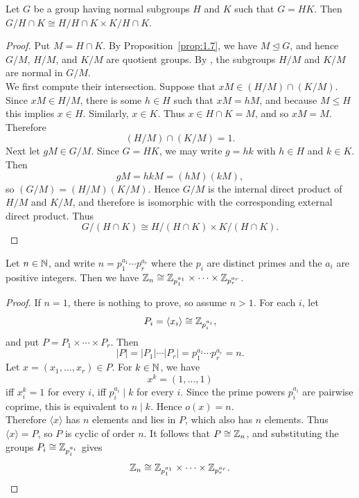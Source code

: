 \documentclass[../Odyssey_Project.tex]{subfiles}
\begin{document}
\begin{lemma}
\label{lem:2.7}
Let $G$ be a group having normal subgroups $H$ and $K$ such that $G = HK$. Then $G/H \cap K \cong H/H \cap K \times K/H \cap K$.
\end{lemma}
\begin{proof}
    Put $M = H \cap K$. By Proposition~\ref{prop:1.7}, we have $M \trianglelefteq G$, and hence $G/M$, $H/M$, and $K/M$ are quotient groups. By , the subgroups $H/M$ and $K/M$ are normal in $G/M$. \\
    We first compute their intersection. Suppose that $xM \in (H/M) \cap (K/M)$. Since $xM \in H/M$, there is some $h \in H$ such that $xM = hM$, and because $M \leq H$ this implies $x \in H$. Similarly, $x \in K$. Thus $x \in H \cap K = M$, and so $xM = M$. Therefore
    \[
        (H/M) \cap (K/M) = 1.
    \]
    Next let $gM \in G/M$. Since $G = HK$, we may write $g = hk$ with $h \in H$ and $k \in K$. Then
    \[
        gM = hkM = (hM)(kM),
    \]
    so $(G/M) = (H/M)(K/M)$. Hence $G/M$ is the internal direct product of $H/M$ and $K/M$, and therefore is isomorphic with the corresponding external direct product. Thus
    \[
        G/(H \cap K) \cong H/(H \cap K) \times K/(H \cap K).
    \]
\end{proof}

\begin{lemma}
\label{lem:2.8}
Let $n \in \mathbb{N}$, and write $n = p_1^{a_1} \cdots p_r^{a_r}$ where the $p_i$ are distinct primes and the $a_i$ are positive integers. Then we have $\mathbb{Z}_n \cong \mathbb{Z}_{p_1^{a_1}} \times \cdots \times \mathbb{Z}_{p_r^{a_r}}$.
\end{lemma}
\begin{proof}
    If $n = 1$, there is nothing to prove, so assume $n > 1$. For each $i$, let
    \[
        P_i = \langle x_i \rangle \cong \mathbb{Z}_{p_i^{a_i}},
    \]
    and put $P = P_1 \times \cdots \times P_r$. Then
    \[
        |P| = |P_1|\cdots |P_r| = p_1^{a_1}\cdots p_r^{a_r} = n.
    \]
    Let $x = (x_1,\dots,x_r) \in P$. For $k \in \mathbb{N}$, we have
    \[
        x^k = (1,\dots,1)
    \]
    iff $x_i^k = 1$ for every $i$, iff $p_i^{a_i} \mid k$ for every $i$. Since the prime powers $p_i^{a_i}$ are pairwise coprime, this is equivalent to $n \mid k$. Hence $o(x) = n$. \\
    Therefore $\langle x \rangle$ has $n$ elements and lies in $P$, which also has $n$ elements. Thus $\langle x \rangle = P$, so $P$ is cyclic of order $n$. It follows that $P \cong \mathbb{Z}_n$, and substituting the groups $P_i \cong \mathbb{Z}_{p_i^{a_i}}$ gives
    \[
        \mathbb{Z}_n \cong \mathbb{Z}_{p_1^{a_1}} \times \cdots \times \mathbb{Z}_{p_r^{a_r}}.
    \]
\end{proof}
\end{document}
